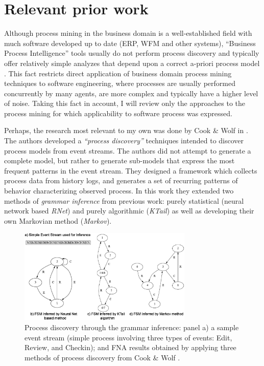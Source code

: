\documentclass{sig-alternate}
\begin{document}
\section{Relevant prior work}
Although process mining in the business domain is a well-established field with much software developed up to date (ERP, WFM and other systems), ``Business Process Intelligence'' tools usually do not perform process discovery and typically offer relatively simple analyzes that depend upon a correct a-priori process model \cite{citeulike:3718014} \cite{citeulike:5044991} \cite{citeulike:2678511}. This fact restricts direct application of business domain process mining techniques to software engineering, where processes are usually performed concurrently by many agents, are more complex and typically have a higher level of noise. Taking this fact in account, I will review only the approaches to the process mining for which applicability to software process was expressed. 

Perhaps, the research most relevant to my own was done by Cook \& Wolf in \cite{citeulike:328044}. The authors developed a \textit{``process discovery''} techniques intended to discover process models from event streams. The authors did not attempt to generate a complete model, but rather to generate sub-models that express the most frequent patterns in the event stream. They designed a framework which collects process data from history logs, and generates a set of recurring patterns of behavior characterizing observed process. In this work they extended two methods of \textit{grammar inference} from previous work: purely statistical (neural network based \textit{RNet}) and purely algorithmic (\textit{KTail}) as well as developing their own Markovian method (\textit{Markov}). 

\begin{figure}[tbp]
   \centering
   \includegraphics[height=45mm]{inference.eps}
   \caption{Process discovery through the grammar inference: panel a) a sample event stream (simple process involving three types of events: Edit, Review, and Checkin); and FNA results obtained by applying three methods of process discovery from Cook \& Wolf \cite{citeulike:328044}.}
   \label{fig:inference}
\end{figure}
\end{document}
